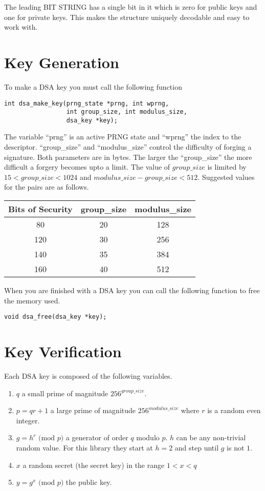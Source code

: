 \documentclass[a4paper]{book}
\begin{document}
The leading BIT STRING has a single bit in it which is zero for public keys and one for private keys.  This makes the structure uniquely decodable and easy
to work with.

\section{Key Generation}
To make a DSA key you must call the following function
\begin{verbatim}
int dsa_make_key(prng_state *prng, int wprng, 
                 int group_size, int modulus_size, 
                 dsa_key *key);
\end{verbatim}
The variable ``prng'' is an active PRNG state and ``wprng'' the index to the descriptor.  ``group\_size'' and 
``modulus\_size'' control the difficulty of forging a signature.  Both parameters are in bytes.  The larger the
``group\_size'' the more difficult a forgery becomes upto a limit.  The value of $group\_size$ is limited by 
$15 < group\_size < 1024$ and $modulus\_size - group\_size < 512$.  Suggested values for the pairs are as follows.

\begin{center}
\begin{tabular}{|c|c|c|}
\hline \textbf{Bits of Security} & \textbf{group\_size} & \textbf{modulus\_size} \\
\hline 80  & 20 & 128 \\
\hline 120 & 30 & 256 \\
\hline 140 & 35 & 384 \\
\hline 160 & 40 & 512 \\
\hline
\end{tabular}
\end{center}

When you are finished with a DSA key you can call the following function to free the memory used.
\begin{verbatim}
void dsa_free(dsa_key *key);
\end{verbatim}

\section{Key Verification}
Each DSA key is composed of the following variables.

\begin{enumerate}
  \item $q$ a small prime of magnitude $256^{group\_size}$.  
  \item $p = qr + 1$ a large prime of magnitude $256^{modulus\_size}$ where $r$ is a random even integer.
  \item $g = h^r \mbox{ (mod }p\mbox{)}$ a generator of order $q$ modulo $p$.  $h$ can be any non-trivial random 
        value.  For this library they start at $h = 2$ and step until $g$ is not $1$.
  \item $x$ a random secret (the secret key) in the range $1 < x < q$ 
  \item $y = g^x \mbox{ (mod }p\mbox{)}$ the public key.
\end{enumerate}
\end{document}
